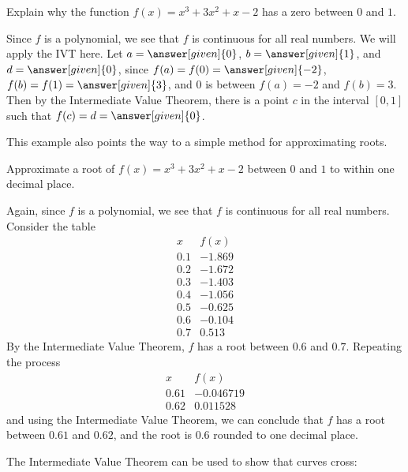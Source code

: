 \documentclass{ximera}
\begin{document}
\begin{example}
Explain why the function $f(x)=x^3 + 3x^2+x-2$ has a zero between $0$
and $1$.


\begin{explanation}
Since $f$ is a polynomial, we see that $f$ is continuous for all real
numbers. We will apply the IVT here. Let   $a=\answer[given]{0}$, $b=\answer[given]{1}$, and $d=\answer[given]{0}$, since $f(a)=f(0)=\answer[given]{-2}$,
$f(b)=f(1)=\answer[given]{3}$, and $0$ is between $f(a)=-2$ and $f(b)=3$. Then by the
Intermediate Value Theorem, there is a point $c$ in the interval
$[0,1]$ such that $f(c)=d=\answer[given]{0}$.
\end{explanation}
\end{example}



This example also points the way to a simple method for approximating
roots.



\begin{example}
Approximate a root of $f(x) =x^3 + 3x^2+x-2$ between $0$ and $1$ to
within one decimal place.

\begin{explanation}
Again, since $f$ is a polynomial, we see that $f$ is continuous for
all real numbers. Consider the table
\[
\begin{array}{c|c}
  x   & f(x) \\ \hline
  0.1 & -1.869\\
  0.2 &-1.672\\
  0.3 & -1.403\\
  0.4 & -1.056\\
  0.5 & -0.625\\
  0.6 & -0.104\\
  0.7 & 0.513
\end{array}
\]
By the Intermediate Value Theorem, $f$ has a root between $0.6$ and
$0.7$. Repeating the process
\[
\begin{array}{c|c}
  x   & f(x) \\ \hline
  0.61 &-0.046719\\
  0.62 & 0.011528
\end{array}
\]
and using the Intermediate Value Theorem, we can conclude that $f$ has a root between $0.61$
and $0.62$, and the root is $0.6$ rounded to one decimal place.
\end{explanation}
\end{example}


The Intermediate Value Theorem can be used to show that curves cross:
\end{document}
